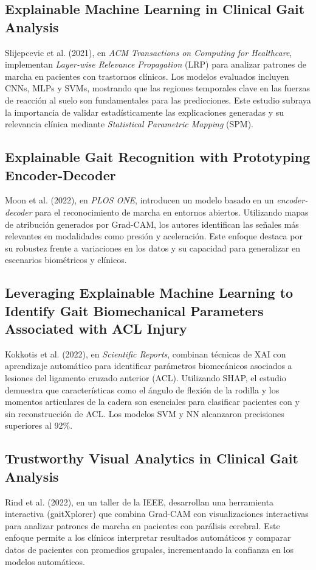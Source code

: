 \documentclass{report}
\begin{document}
\subsection{Explainable Machine Learning in Clinical Gait Analysis}
Slijepcevic et al. (2021), en \textit{ACM Transactions on Computing for Healthcare}, implementan \textit{Layer-wise Relevance Propagation} (LRP) para analizar patrones de marcha en pacientes con trastornos clínicos. Los modelos evaluados incluyen CNNs, MLPs y SVMs, mostrando que las regiones temporales clave en las fuerzas de reacción al suelo son fundamentales para las predicciones. Este estudio subraya la importancia de validar estadísticamente las explicaciones generadas y su relevancia clínica mediante \textit{Statistical Parametric Mapping} (SPM).

\subsection{Explainable Gait Recognition with Prototyping Encoder-Decoder}
Moon et al. (2022), en \textit{PLOS ONE}, introducen un modelo basado en un \textit{encoder-decoder} para el reconocimiento de marcha en entornos abiertos. Utilizando mapas de atribución generados por Grad-CAM, los autores identifican las señales más relevantes en modalidades como presión y aceleración. Este enfoque destaca por su robustez frente a variaciones en los datos y su capacidad para generalizar en escenarios biométricos y clínicos.

\subsection{Leveraging Explainable Machine Learning to Identify Gait Biomechanical Parameters Associated with ACL Injury}
Kokkotis et al. (2022), en \textit{Scientific Reports}, combinan técnicas de XAI con aprendizaje automático para identificar parámetros biomecánicos asociados a lesiones del ligamento cruzado anterior (ACL). Utilizando SHAP, el estudio demuestra que características como el ángulo de flexión de la rodilla y los momentos articulares de la cadera son esenciales para clasificar pacientes con y sin reconstrucción de ACL. Los modelos SVM y NN alcanzaron precisiones superiores al 92\%.

\subsection{Trustworthy Visual Analytics in Clinical Gait Analysis}
Rind et al. (2022), en un taller de la IEEE, desarrollan una herramienta interactiva (gaitXplorer) que combina Grad-CAM con visualizaciones interactivas para analizar patrones de marcha en pacientes con parálisis cerebral. Este enfoque permite a los clínicos interpretar resultados automáticos y comparar datos de pacientes con promedios grupales, incrementando la confianza en los modelos automáticos.
\end{document}
